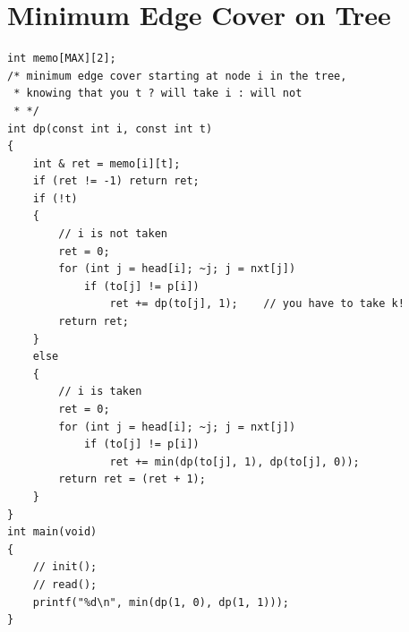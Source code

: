 \documentclass[12pt]{book}
\begin{document}
\section{Minimum Edge Cover on Tree}
\begin{verbatim}
int memo[MAX][2];
/* minimum edge cover starting at node i in the tree,
 * knowing that you t ? will take i : will not
 * */
int dp(const int i, const int t)
{
	int & ret = memo[i][t];
	if (ret != -1) return ret;
	if (!t)
	{
		// i is not taken
		ret = 0;
		for (int j = head[i]; ~j; j = nxt[j])
			if (to[j] != p[i])
				ret += dp(to[j], 1);	// you have to take k!
		return ret;
	}
	else
	{
		// i is taken
		ret = 0;
		for (int j = head[i]; ~j; j = nxt[j])
			if (to[j] != p[i])
				ret += min(dp(to[j], 1), dp(to[j], 0));
		return ret = (ret + 1);
	}
}
int main(void)
{
	// init();
	// read();
	printf("%d\n", min(dp(1, 0), dp(1, 1)));
}
\end{verbatim}
\end{document}
